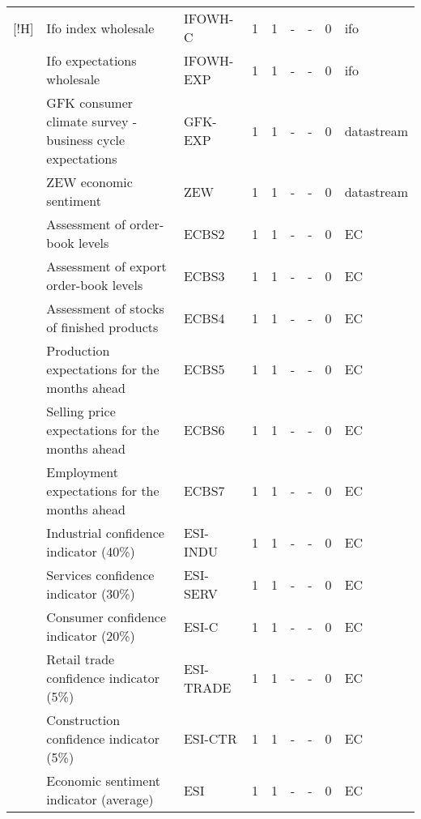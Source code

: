 \documentclass[10pt]{article}
\begin{document}
\begin{footnotesize}
\begin{longtable}{p{1.1in}|p{2.5in}|p{1in}|p{.1in}|p{.1in}|p{.1in}|p{.15in}|p{.1in}|p{.5in}}[!H]
 & {\tiny{}Ifo index wholesale} & {\tiny{}IFOWH-C} & {\tiny{}1} & {\tiny{}1} & {\tiny{}-} & {\tiny{}-} & {\tiny{}0} & {\tiny{}ifo}\tabularnewline
 & {\tiny{}Ifo expectations wholesale} & {\tiny{}IFOWH-EXP} & {\tiny{}1} & {\tiny{}1} & {\tiny{}-} & {\tiny{}-} & {\tiny{}0} & {\tiny{}ifo}\tabularnewline
 & {\tiny{}GFK consumer climate survey - business cycle expectations} & {\tiny{}GFK-EXP} & {\tiny{}1} & {\tiny{}1} & {\tiny{}-} & {\tiny{}-} & {\tiny{}0} & {\tiny{}datastream}\tabularnewline
 & {\tiny{}ZEW economic sentiment} & {\tiny{}ZEW} & {\tiny{}1} & {\tiny{}1} & {\tiny{}-} & {\tiny{}-} & {\tiny{}0} & {\tiny{}datastream}\tabularnewline
 & {\tiny{}Assessment of order-book levels } & {\tiny{}ECBS2} & {\tiny{}1} & {\tiny{}1} & {\tiny{}-} & {\tiny{}-} & {\tiny{}0} & {\tiny{}EC}\tabularnewline
 & {\tiny{}Assessment of export order-book levels } & {\tiny{}ECBS3} & {\tiny{}1} & {\tiny{}1} & {\tiny{}-} & {\tiny{}-} & {\tiny{}0} & {\tiny{}EC}\tabularnewline
 & {\tiny{}Assessment of stocks of finished products } & {\tiny{}ECBS4} & {\tiny{}1} & {\tiny{}1} & {\tiny{}-} & {\tiny{}-} & {\tiny{}0} & {\tiny{}EC}\tabularnewline
 & {\tiny{}Production expectations for the months ahead } & {\tiny{}ECBS5} & {\tiny{}1} & {\tiny{}1} & {\tiny{}-} & {\tiny{}-} & {\tiny{}0} & {\tiny{}EC}\tabularnewline
 & {\tiny{}Selling price expectations for the months ahead } & {\tiny{}ECBS6} & {\tiny{}1} & {\tiny{}1} & {\tiny{}-} & {\tiny{}-} & {\tiny{}0} & {\tiny{}EC}\tabularnewline
 & {\tiny{}Employment expectations for the months ahead } & {\tiny{}ECBS7} & {\tiny{}1} & {\tiny{}1} & {\tiny{}-} & {\tiny{}-} & {\tiny{}0} & {\tiny{}EC}\tabularnewline
 & {\tiny{}Industrial confidence indicator (40\%)} & {\tiny{}ESI-INDU} & {\tiny{}1} & {\tiny{}1} & {\tiny{}-} & {\tiny{}-} & {\tiny{}0} & {\tiny{}EC}\tabularnewline
 & {\tiny{}Services confidence indicator (30\%)} & {\tiny{}ESI-SERV} & {\tiny{}1} & {\tiny{}1} & {\tiny{}-} & {\tiny{}-} & {\tiny{}0} & {\tiny{}EC}\tabularnewline
 & {\tiny{}Consumer confidence indicator (20\%)} & {\tiny{}ESI-C} & {\tiny{}1} & {\tiny{}1} & {\tiny{}-} & {\tiny{}-} & {\tiny{}0} & {\tiny{}EC}\tabularnewline
 & {\tiny{}Retail trade confidence indicator (5\%)} & {\tiny{}ESI-TRADE} & {\tiny{}1} & {\tiny{}1} & {\tiny{}-} & {\tiny{}-} & {\tiny{}0} & {\tiny{}EC}\tabularnewline
 & {\tiny{}Construction confidence indicator (5\%)} & {\tiny{}ESI-CTR} & {\tiny{}1} & {\tiny{}1} & {\tiny{}-} & {\tiny{}-} & {\tiny{}0} & {\tiny{}EC}\tabularnewline
 & {\tiny{}Economic sentiment indicator (average)} & {\tiny{}ESI} & {\tiny{}1} & {\tiny{}1} & {\tiny{}-} & {\tiny{}-} & {\tiny{}0} & {\tiny{}EC}\tabularnewline

\end{longtable}
\end{footnotesize}
\end{document}
